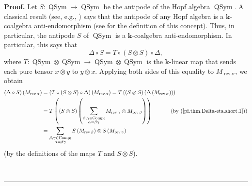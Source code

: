 \documentclass[numbers=enddot,12pt,final,onecolumn,notitlepage]{scrartcl}%
\theoremstyle{definition}
\newenvironment{proof}[1][Proof]{\noindent\textbf{#1.} }{\ \rule{0.5em}{0.5em}}
\let\sumnonlimits\sum
\renewcommand{\sum}{\sumnonlimits\limits}
\newenvironment{vershort}{}{}
\begin{document}
\begin{vershort}
\begin{proof}
Let $S:\operatorname*{QSym}\rightarrow\operatorname*{QSym}$ be the antipode of
the Hopf algebra $\operatorname*{QSym}$. A classical result (see, e.g.,
\cite[Exercise 1.4.28]{GriRei}) says that the antipode of any Hopf algebra is
a $\mathbf{k}$-coalgebra anti-endomorphism (see \cite[Definition
1.4.8]{GriRei} for the definition of this concept). Thus, in particular, the
antipode $S$ of $\operatorname*{QSym}$ is a $\mathbf{k}$-coalgebra
anti-endomorphism. In particular, this says that
\[
\Delta\circ S=T\circ\left(  S\otimes S\right)  \circ\Delta,
\]
where $T:\operatorname*{QSym}\otimes\operatorname*{QSym}\rightarrow
\operatorname*{QSym}\otimes\operatorname*{QSym}$ is the $\mathbf{k}$-linear
map that sends each pure tensor $x\otimes y$ to $y\otimes x$. Applying both
sides of this equality to $M_{\operatorname*{rev}\alpha}$, we obtain%
\begin{align}
\left(  \Delta\circ S\right)  \left(  M_{\operatorname*{rev}\alpha}\right)
&  =\left(  T\circ\left(  S\otimes S\right)  \circ\Delta\right)  \left(
M_{\operatorname*{rev}\alpha}\right)  =T\left(  \left(  S\otimes S\right)
\left(  \Delta\left(  M_{\operatorname*{rev}\alpha}\right)  \right)  \right)
\nonumber\\
&  =T\left(  \left(  S\otimes S\right)  \left(  \sum_{\substack{\beta
,\gamma\in\operatorname*{Comp};\\\alpha=\beta\gamma}}M_{\operatorname*{rev}%
\gamma}\otimes M_{\operatorname*{rev}\beta}\right)  \right)
\ \ \ \ \ \ \ \ \ \ \left(  \text{by (\ref{pf.thm.Delta-eta.short.1})}\right)
\nonumber\\
&  =\sum_{\substack{\beta,\gamma\in\operatorname*{Comp};\\\alpha=\beta\gamma
}}S\left(  M_{\operatorname*{rev}\beta}\right)  \otimes S\left(
M_{\operatorname*{rev}\gamma}\right)  \label{pf.thm.Delta-eta.short.4}%
\end{align}
(by the definitions of the maps $T$ and $S\otimes S$).


\end{proof}
\end{vershort}
\end{document}
